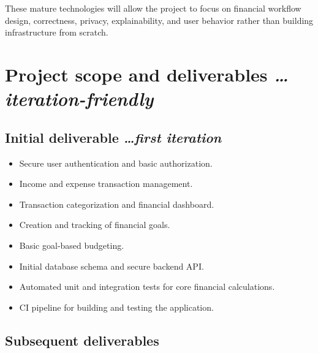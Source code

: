 \documentclass[11pt,a4paper]{article}
\newcommand{\BvrHint}[1]{%
  {\normalfont\normalsize\itshape\hfill #1}}
\begin{document}
These mature technologies will allow the project to focus on financial
workflow design, correctness, privacy, explainability, and user behavior
rather than building infrastructure from scratch.


\section{Project scope and deliverables%
  \BvrHint{\ldots iteration-friendly}}

\subsection{Initial deliverable%
  \BvrHint{\ldots first iteration}}

\begin{itemize}[leftmargin=0.7cm]
    \item Secure user authentication and basic authorization.
    
    \item Income and expense transaction management.
    
    \item Transaction categorization and financial dashboard.
    
    \item Creation and tracking of financial goals.
    
    \item Basic goal-based budgeting.
    
    \item Initial database schema and secure backend API.
    
    \item Automated unit and integration tests for core financial calculations.
    
    \item CI pipeline for building and testing the application.
\end{itemize}


\subsection{Subsequent deliverables}
\end{document}
